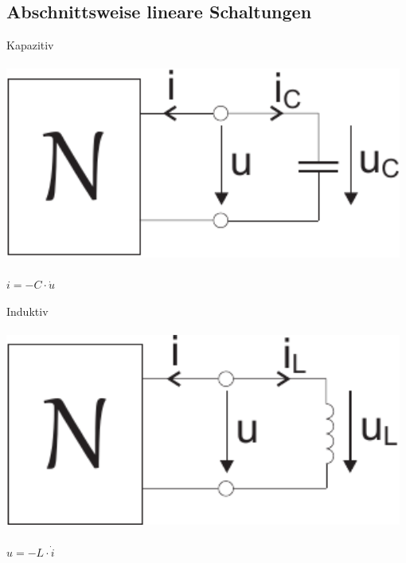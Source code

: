 \documentclass[a4paper,twocolumn,10pt]{article}
\begin{document}
\subsection*{Abschnittsweise lineare Schaltungen}
\begin{minipage}[t]{0.23\textwidth}
Kapazitiv\\\\
\includegraphics[width=0.98\textwidth]{img/DynamischerPfadN1}\\\\
$i=-C\cdot\dot u$
\end{minipage}
\hfill
\begin{minipage}[t]{0.23\textwidth}
Induktiv\\\\
\includegraphics[width=0.98\textwidth]{img/DynamischerPfadN2}\\\\
$u=-L\cdot\dot i$
\end{minipage}
\end{document}
